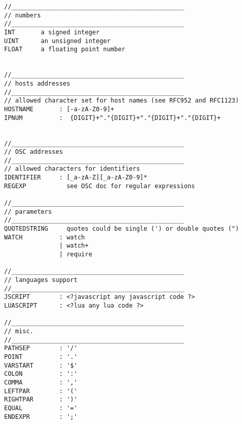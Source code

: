 \begin{verbatim}
//_______________________________________________
// numbers
//_______________________________________________
INT       a signed integer
UINT      an unsigned integer
FLOAT     a floating point number


//_______________________________________________
// hosts addresses
//_______________________________________________
// allowed character set for host names (see RFC952 and RFC1123)
HOSTNAME       : [-a-zA-Z0-9]+ 
IPNUM          :  {DIGIT}+"."{DIGIT}+"."{DIGIT}+"."{DIGIT}+


//_______________________________________________
// OSC addresses
//_______________________________________________
// allowed characters for identifiers
IDENTIFIER     : [_a-zA-Z][_a-zA-Z0-9]*
REGEXP           see OSC doc for regular expressions

//_______________________________________________
// parameters
//_______________________________________________
QUOTEDSTRING     quotes could be single (') or double quotes (")
WATCH          : watch
               | watch+
               | require

//_______________________________________________
// languages support
//_______________________________________________
JSCRIPT        : <?javascript any javascript code ?>
LUASCRIPT      : <?lua any lua code ?>

//_______________________________________________
// misc.
//_______________________________________________
PATHSEP        : '/'
POINT          : '.'
VARSTART       : '$'
COLON          : ':'
COMMA          : ','
LEFTPAR        : '('
RIGHTPAR       : ')'
EQUAL          : '='
ENDEXPR        : ';'
\end{verbatim}
